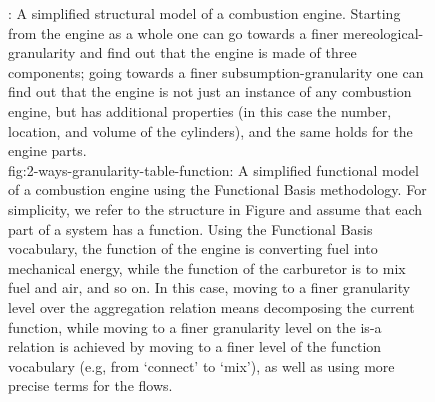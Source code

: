 \documentclass[
]{ceurart}
\begin{document}
\begin{figure}
\begin{subfigure}{0.49\textwidth}
    \caption{}
    \label{fig:2-ways-granularity-table-function}
    \end{subfigure}
\caption{: A simplified structural model of a combustion engine. Starting from the engine as a whole one can go towards a finer mereological-granularity and find out that the engine is made of three components; going towards a finer subsumption-granularity one can find out that the engine is not just an instance of any combustion engine, but has additional properties (in this case the number, location, and volume of the cylinders), and the same holds for the engine parts. \\
\subref
{fig:2-ways-granularity-table-function}: A simplified functional model of a combustion engine using the Functional Basis methodology. For simplicity, we refer to the structure in Figure  and assume that each part of a system has a function. Using the Functional Basis vocabulary, the function of the engine is converting fuel into mechanical energy, while the function of the carburetor is to mix fuel and air, and so on. In this case, moving to a finer granularity level over the aggregation relation means decomposing the current function, while moving to a finer granularity level on the is-a relation is achieved by moving to a finer level of the function vocabulary (e.g, from `connect' to `mix'), as well as using more precise terms for the flows.}
\label{fig:due-figure}
\end{figure}



\end{document}
